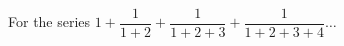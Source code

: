 
%
%
%
%
% 
% 

\question For the series $1 + \dfrac{1}{1+2} + \dfrac{1}{1+2+3} + \dfrac{1}{1+2+3+4}\ldots$

\insertQR{}

\ifprintanswers
\fi 

